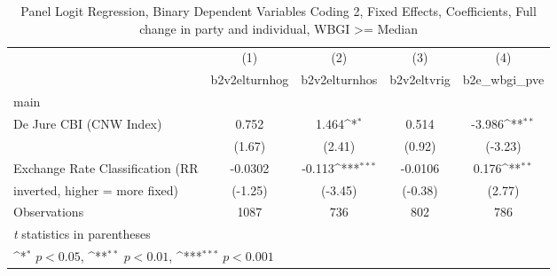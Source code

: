 \begin{table}[htbp]\centering
\def\sym#1{\ifmmode^{#1}\else\(^{#1}\)\fi}
\caption{Panel Logit Regression, Binary Dependent Variables Coding 2, Fixed Effects, Coefficients, Full change in party and individual, WBGI >= Median \label{logitFEMultInd2DJ}}
\begin{tabular}{l*{4}{c}}
\toprule
                                        &\multicolumn{1}{c}{(1)}&\multicolumn{1}{c}{(2)}&\multicolumn{1}{c}{(3)}&\multicolumn{1}{c}{(4)}\\
                                        &\multicolumn{1}{c}{b2v2elturnhog}&\multicolumn{1}{c}{b2v2elturnhos}&\multicolumn{1}{c}{b2v2eltvrig}&\multicolumn{1}{c}{b2e\_wbgi\_pve}\\
\midrule
main                                    &                  &                  &                  &                  \\
De Jure CBI (CNW Index)                 &    0.752         &    1.464\sym{*}  &    0.514         &   -3.986\sym{**} \\
                                        &   (1.67)         &   (2.41)         &   (0.92)         &  (-3.23)         \\
\addlinespace
Exchange Rate Classification (RR        &  -0.0302         &   -0.113\sym{***}&  -0.0106         &    0.176\sym{**} \\
inverted, higher = more fixed)          &  (-1.25)         &  (-3.45)         &  (-0.38)         &   (2.77)         \\
\midrule
Observations                            &     1087         &      736         &      802         &      786         \\
\bottomrule
\multicolumn{5}{l}{\footnotesize \textit{t} statistics in parentheses}\\
\multicolumn{5}{l}{\footnotesize \sym{*} \(p<0.05\), \sym{**} \(p<0.01\), \sym{***} \(p<0.001\)}\\
\end{tabular}
\end{table}
